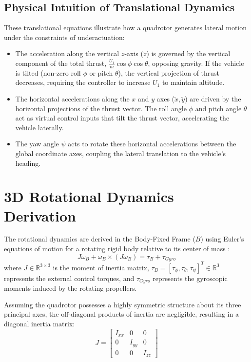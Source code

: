 \subsection{Physical Intuition of Translational Dynamics}
These translational equations illustrate how a quadrotor generates lateral motion under the constraints of underactuation:
\begin{itemize}
    \item The acceleration along the vertical $z$-axis ($\ddot{z}$) is governed by the vertical component of the total thrust, $\frac{U_1}{m}\cos\phi\cos\theta$, opposing gravity. If the vehicle is tilted (non-zero roll $\phi$ or pitch $\theta$), the vertical projection of thrust decreases, requiring the controller to increase $U_1$ to maintain altitude.
    \item The horizontal accelerations along the $x$ and $y$ axes ($\ddot{x}, \ddot{y}$) are driven by the horizontal projections of the thrust vector. The roll angle $\phi$ and pitch angle $\theta$ act as virtual control inputs that tilt the thrust vector, accelerating the vehicle laterally.
    \item The yaw angle $\psi$ acts to rotate these horizontal accelerations between the global coordinate axes, coupling the lateral translation to the vehicle's heading.
\end{itemize}

\section{3D Rotational Dynamics Derivation}
The rotational dynamics are derived in the Body-Fixed Frame ($B$) using Euler's equations of motion for a rotating rigid body relative to its center of mass \cite{ref_57, ref_60}:
\begin{equation}
J \dot{\omega}_B + \omega_B \times (J \omega_B) = \tau_B + \tau_{Gyro}
\end{equation}
where $J \in \mathbb{R}^{3 \times 3}$ is the moment of inertia matrix, $\tau_B = [\tau_{\phi}, \tau_{\theta}, \tau_{\psi}]^T \in \mathbb{R}^3$ represents the external control torques, and $\tau_{Gyro}$ represents the gyroscopic moments induced by the rotating propellers.

Assuming the quadrotor possesses a highly symmetric structure about its three principal axes, the off-diagonal products of inertia are negligible, resulting in a diagonal inertia matrix:
\begin{equation}
J = \begin{bmatrix} I_{xx} & 0 & 0 \\ 0 & I_{yy} & 0 \\ 0 & 0 & I_{zz} \end{bmatrix}
\end{equation}

